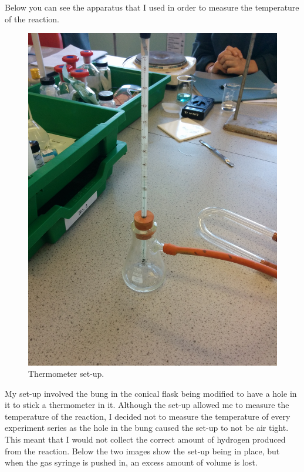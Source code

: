 Below you can see the apparatus that I used in order to measure the temperature of the reaction.

\begin{figure}[H]
    \includegraphics[width=\textwidth]{./preliminarywork/images/ThermometerSetUp.jpg}
    \caption{Thermometer set-up.} \label{fig:Thermometer Set-Up}
\end{figure}

My set-up involved the bung in the conical flask being modified to have a hole in it to stick a thermometer in it. Although the set-up allowed me to measure the temperature of the reaction, I decided not to measure the temperature of every experiment series as the hole in the bung caused the set-up to not be air tight. This meant that I would not collect the correct amount of hydrogen produced from the reaction. Below the two images show the set-up being in place, but when the gas syringe is pushed in, an excess amount of volume is lost.

